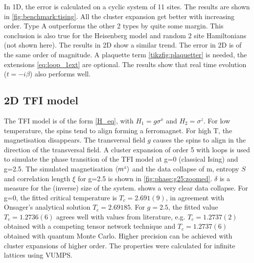 \documentclass[twocolumn]{article}
\newcounter{a}
\newcounter{b}
\begin{document}
In 1D, the error is calculated on a cyclic system of 11 sites. The results are shown in \cref{fig:benchmark:tising}. All the cluster expansion get better with increasing order. Type A outperforms the other 2 types by quite some margin. This conclusion is also true for the Heisenberg model and random 2 site Hamiltonians (not shown here). The results in 2D show a similar trend. The error in 2D is of the same order of magnitude. A plaquette term \cref{tikzfig:plaquetter} is needed, the extensions \cref{eq:loop_1ext}  are optional. The results show that real time evolution ($t = - i \beta$) also performs well.

\subsection{2D TFI model}
The TFI model is of the form \cref{H_eq}, with $H_1=g  \sigma ^x$ and $H_2= \sigma^z$. For low temperature, the spins tend to align forming a ferromagnet. For high T, the magnetisation disappears. The transversal field $g$ causes the spins to align in the direction of the transversal field. A cluster expansion of order 5 with loops is used to simulate the phase transition of the TFI model at g=0 (classical Ising) and g=2.5. The simulated magnetisation $ \braket{m^z}$ and the data collapse of m, entropy $S$ and correlation length $\xi$ for g=2.5 is shown in \cref{fig:phase:g25:zoomed}. $\delta$ is a measure for the (inverse) size of the system.  shows a very clear data collapse. For g=0, the fitted critical temperature is $T_c = 2.691(9)$, in agreement with Onsager's analytical solution $T_c = 2.69185$. For $g=2.5$, the fitted value $T_c=1.2736(6)$ agrees well with values from literature, e.g. $T_c=1.2737(2)$ obtained with a competing tensor network technique and $T_c=1.2737(6)$ obtained with quantum Monte Carlo. \cite{Czarnik2019} Higher precision can be achieved with cluster expansions of higher order. The properties were calculated for infinite lattices using VUMPS.
\end{document}
